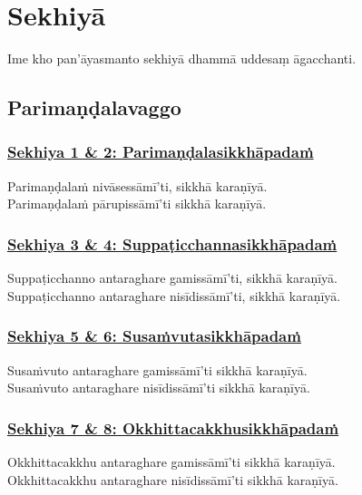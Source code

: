 \section{Sekhiyā}
\label{sekh}

\begin{intro}
  Ime kho pan'āyasmanto sekhiyā dhammā uddesaṃ āgacchanti.
\end{intro}

\setsubsecheadstyle{\subsectionFmt}
\subsection{Parimaṇḍalavaggo}
\vspace{0.2cm}

\subsubsection*{\hyperref[training1-2]{Sekhiya 1 \& 2: Parimaṇḍalasikkhāpadaṁ}}
\label{sekh1-2}
Parimaṇḍalaṁ nivāsessāmī'ti, sikkhā karaṇīyā.\\
Parimaṇḍalaṁ pārupissāmī'ti sikkhā karaṇīyā.

\subsubsection*{\hyperref[training3-4]{Sekhiya 3 \& 4: Suppaṭicchannasikkhāpadaṁ}}
\label{sekh3-4}
Suppaṭicchanno antaraghare gamissāmī'ti, sikkhā karaṇīyā.\\
Suppaṭicchanno antaraghare nisīdissāmī'ti, sikkhā karaṇīyā.

\subsubsection*{\hyperref[training5-6]{Sekhiya 5 \& 6: Susaṁvutasikkhāpadaṁ}}
\label{sekh5-6}
Susaṁvuto antaraghare gamissāmī'ti sikkhā karaṇīyā.\\
Susaṁvuto antaraghare nisīdissāmī'ti sikkhā karaṇīyā.

\subsubsection*{\hyperref[training7-8]{Sekhiya 7 \& 8: Okkhittacakkhusikkhāpadaṁ}}
\label{sekh7-8}
Okkhittacakkhu antaraghare gamissāmī'ti sikkhā karaṇīyā.\\
Okkhittacakkhu antaraghare nisīdissāmī'ti sikkhā karaṇīyā.

